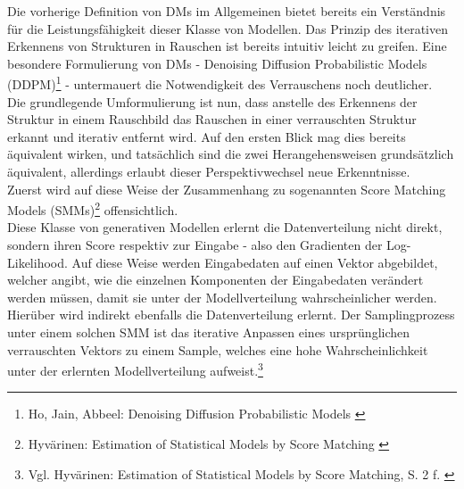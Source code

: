 Die vorherige Definition von \ac{DM}s im Allgemeinen bietet bereits ein Verständnis für die Leistungsfähigkeit dieser Klasse von Modellen. Das Prinzip des iterativen Erkennens von Strukturen in Rauschen ist bereits intuitiv leicht zu greifen. Eine besondere Formulierung von \ac{DM}s - Denoising Diffusion Probabilistic Models (DDPM)\footnote{
    Ho, Jain, Abbeel: Denoising Diffusion Probabilistic Models
    \cite{ho2020denoisingdiffusionprobabilisticmodels}
} - untermauert die Notwendigkeit des Verrauschens noch deutlicher. \\
Die grundlegende Umformulierung ist nun, dass anstelle des Erkennens der Struktur in einem Rauschbild das Rauschen in einer verrauschten Struktur erkannt und iterativ entfernt wird. Auf den ersten Blick mag dies bereits äquivalent wirken, und tatsächlich sind die zwei Herangehensweisen grundsätzlich äquivalent, allerdings erlaubt dieser Perspektivwechsel neue Erkenntnisse. \\
Zuerst wird auf diese Weise der Zusammenhang zu sogenannten Score Matching Models (SMMs)\footnote{
    Hyvärinen: Estimation of Statistical Models by Score Matching
    \cite{JMLR:v6:hyvarinen05a}
} offensichtlich. \\
Diese Klasse von generativen Modellen erlernt die Datenverteilung nicht direkt, sondern ihren Score respektiv zur Eingabe - also den Gradienten der Log-Likelihood. Auf diese Weise werden Eingabedaten auf einen Vektor abgebildet, welcher angibt, wie die einzelnen Komponenten der Eingabedaten verändert werden müssen, damit sie unter der Modellverteilung wahrscheinlicher werden. Hierüber wird indirekt ebenfalls die Datenverteilung erlernt. Der Samplingprozess unter einem solchen \ac{SMM} ist das iterative Anpassen eines ursprünglichen verrauschten Vektors zu einem Sample, welches eine hohe Wahrscheinlichkeit unter der erlernten Modellverteilung aufweist.\footnote{
    Vgl. Hyvärinen: Estimation of Statistical Models by Score Matching, S. 2 f.
    \cite{JMLR:v6:hyvarinen05a}
} \\

